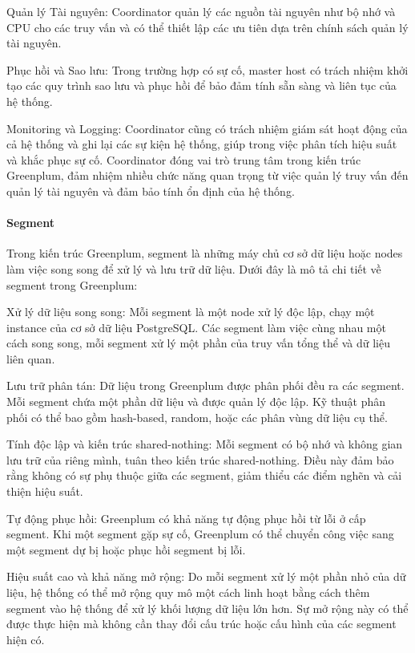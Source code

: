 \documentclass{article}[14pt]
\begin{document}
Quản lý Tài nguyên: Coordinator quản lý các nguồn tài nguyên như bộ nhớ và CPU cho các truy vấn và có thể thiết lập các ưu tiên dựa trên chính sách quản lý tài nguyên.

Phục hồi và Sao lưu: Trong trường hợp có sự cố, master host có trách nhiệm khởi tạo các quy trình sao lưu và phục hồi để bảo đảm tính sẵn sàng và liên tục của hệ thống.

Monitoring và Logging: Coordinator cũng có trách nhiệm giám sát hoạt động của cả hệ thống và ghi lại các sự kiện hệ thống, giúp trong việc phân tích hiệu suất và khắc phục sự cố. Coordinator đóng vai trò trung tâm trong kiến trúc Greenplum, đảm nhiệm nhiều chức năng quan trọng từ việc quản lý truy vấn đến quản lý tài nguyên và đảm bảo tính ổn định của hệ thống.

\paragraph{Segment}

Trong kiến trúc Greenplum, segment là những máy chủ cơ sở dữ liệu hoặc
nodes làm việc song song để xử lý và lưu trữ dữ liệu. Dưới đây là mô tả chi tiết về segment trong Greenplum:

Xử lý dữ liệu song song: Mỗi segment là một node xử lý độc lập, chạy một instance của cơ sở dữ liệu PostgreSQL. Các segment làm việc cùng nhau một cách song song, mỗi segment xử lý một phần của truy vấn tổng thể và dữ liệu liên quan.

Lưu trữ phân tán: Dữ liệu trong Greenplum được phân phối đều ra các segment. Mỗi segment chứa một phần dữ liệu và được quản lý độc lập.
Kỹ thuật phân phối có thể bao gồm hash-based, random, hoặc các phân vùng
dữ liệu cụ thể. 

Tính độc lập và kiến trúc shared-nothing:
Mỗi segment có bộ nhớ và không gian lưu trữ của riêng mình, tuân theo kiến trúc shared-nothing. Điều này đảm bảo rằng không có sự phụ thuộc giữa các segment, giảm thiểu các điểm nghẽn và cải thiện hiệu suất.

Tự động phục hồi: Greenplum có khả năng tự động phục hồi từ lỗi ở cấp segment. Khi một segment gặp sự cố, Greenplum có thể chuyển công việc sang một segment dự bị hoặc phục hồi segment bị lỗi.

Hiệu suất cao và khả năng mở rộng: Do mỗi segment xử lý một phần nhỏ của dữ liệu, hệ thống có thể mở rộng quy mô một cách linh hoạt bằng cách thêm segment vào hệ thống để xử lý khối lượng dữ liệu lớn hơn.
Sự mở rộng này có thể được thực hiện mà không cần thay đổi cấu trúc hoặc
cấu hình của các segment hiện có.
\end{document}
